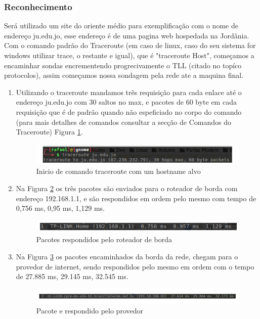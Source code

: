 \documentclass[
	article,			%
	11pt,				%
	oneside,			%
	a4paper,			%
	english,			%
	brazil,				%
	sumario=tradicional
	]{abntex2}
\begin{document}
\subsubsection{Reconhecimento}
 Será utilizado um site do oriente médio para exemplificação com o nome de endereço ju.edu.jo, esse endereço é de uma pagina web hospedada na Jordânia.
 Com o comando padrão do Traceroute (em caso de linux, caso do seu sistema for windows utilizar trace, o restante e igual), que é "traceroute Host", começamos a encaminhar sondas encrementendo progrecivamente o TLL (citado no topíco protocolos), assim começamos nossa sondagem pela rede ate a maquina final. 
 \begin{enumerate}
 	\item
 	Utilizando o traceroute mandamos três requisição para cada enlace até o endereço ju.edu.jo com 30 saltos no max, e pacotes de 60 byte em cada requisição que é de padrão quando não espeficiado no corpo do comando (para mais detalhes de comandos consultar a secção de Comandos do Traceroute) Figura \ref{rota-1}.
 		\begin{figure}[!h]
	 		\centering
	 		\includegraphics[scale=0.65]{./rota-1.png}
	 		\caption{Inicio de comando traceroute com um hostname alvo}
	 		\label{rota-1}
	 	\end{figure}
 	
 	\item
 	Na Figura \ref{rota-2} os três pacotes são enviados para o roteador de borda com endereço 192.168.1.1, e são respondidos em ordem pelo mesmo com tempo de 0,756 ms, 0,95 ms, 1,129 ms.
 	\begin{figure}[!h]
 		\centering
 		\includegraphics[scale=0.7]{./rota-2.png}
 		\caption{Pacotes respondidos pelo roteador de borda}
 		\label{rota-2}
 	\end{figure}
 	
 	\item
 	Na Figura \ref{rota-3} os pacotes encaminhados da borda da rede, chegam para o provedor de internet, sendo respondidos pelo mesmo em ordem com o tempo de 27.885 ms, 29.145 ms, 32.545 ms.	
 	\begin{figure}[!h]
 		\centering
 		\includegraphics[scale=0.6]{./rota-3.png}
 		\caption{Pacote e respondido pelo provedor}
 		\label{rota-3}
 	\end{figure}
 

\end{enumerate}
\end{document}
